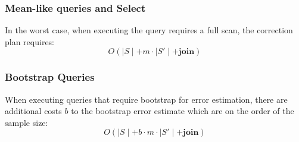 \subsubsection{Mean-like queries and Select}
In the worst case, when executing the query requires a full scan, the correction plan requires:
 \[O(\mid S \mid + m \cdot \mid S' \mid + \textbf{join})\]

 \subsubsection{Bootstrap Queries}
When executing queries that require bootstrap for error estimation, there are additional costs $b$ to the bootstrap error estimate which are on the order of the sample size:
 \[O(\mid S \mid + b\cdot m \cdot \mid S' \mid + \textbf{join})\]

